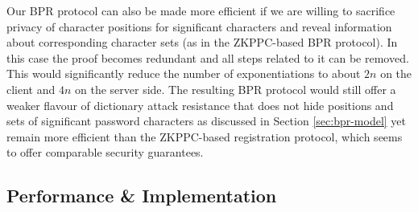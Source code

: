 %
Our \ac{BPR} protocol can also be made more efficient if we are willing to sacrifice privacy of character positions for significant characters and reveal information about corresponding character sets (as in the \ac{ZKPPC}-based \ac{BPR} protocol). 
In this case the proof \PoS becomes redundant and all steps related to it can be removed. 
This would significantly reduce the number of exponentiations to about $2n$ on the client and $4n$ on the server side. 
The resulting \ac{BPR} protocol would still offer a weaker flavour of dictionary attack resistance that does not hide positions and sets of significant password characters as discussed in Section \ref{sec:bpr-model} yet remain more efficient than the \ac{ZKPPC}-based registration protocol, which seems to offer comparable security guarantees.


\subsection{Performance \& Implementation} \label{sec:performance}

